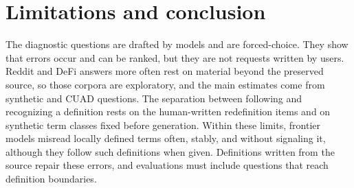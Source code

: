\section{Limitations and conclusion}
\label{sec:conclusion}
The diagnostic questions are drafted by models and are forced-choice. They show that errors occur and can be ranked, but they are not requests written by users. Reddit and DeFi answers more often rest on material beyond the preserved source, so those corpora are exploratory, and the main estimates come from synthetic and CUAD questions. The separation between following and recognizing a definition rests on the human-written redefinition items and on synthetic term classes fixed before generation. Within these limits, frontier models misread locally defined terms often, stably, and without signaling it, although they follow such definitions when given. Definitions written from the source repair these errors, and evaluations must include questions that reach definition boundaries.
\label{main:end}
